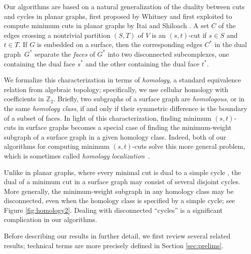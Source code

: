 \documentclass[letterpaper,review]{siamart190516}
\def\Z{\mathbb{Z}}
\begin{document}
Our algorithms are based on a natural generalization of the duality between cuts and cycles in planar graphs, first proposed by Whitney \cite{w-pg-33} and first exploited to compute minimum cuts in planar graphs by Itai and Shiloach \cite{is-mfpn-79}.  
A set $C$ of the edges crossing a nontrivial partition $(S,T)$ of $V$ is an $(s,t)$-cut if $s\in S$ and $t \in T$.
If $G$ is embedded on a surface, then the corresponding edges $C^*$ in the dual graph~$G^*$ separate the \emph{faces} of $G^*$ into two disconnected subcomplexes, one containing the dual face $s^*$ and the other containing the dual face $t^*$. 

We formalize this characterization in terms of \emph{homology}, a standard equivalence relation from algebraic topology; specifically, we use cellular homology with coefficients in $\Z_2$.  Briefly, two subgraphs of a surface graph are \emph{homologous}, or in the same \emph{homology class}, if and only if their symmetric difference is the boundary of a subset of faces.  In light of this characterization, finding minimum $(s,t)$-cuts in surface graphs becomes a special case of finding the minimum-weight subgraph of a surface graph in a given homology class.  Indeed, both of our algorithms for computing minimum $(s,t)$-cuts solve this more general problem, which is sometimes called \emph{homology localization}~\cite{cf-qhc-08,cf-hrhl-10}.

Unlike in planar graphs, where every minimal cut is  dual to a simple cycle \cite{w-pg-33}, the dual of a minimum cut in a surface graph may consist of several disjoint cycles.  More generally, the minimum-weight subgraph in any homology class may be disconnected, even when the homology class is specified by a simple cycle; see Figure \ref{fig:homology2}.  Dealing with disconnected “cycles” is a significant complication in our algorithms.

Before describing our results in further detail, we first review several related results; technical terms are more precisely defined in Section \ref{sec:prelims}.

\end{document}
